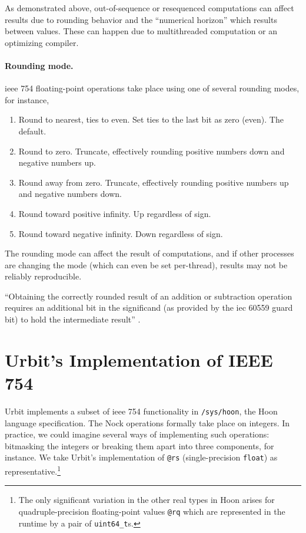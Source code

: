 \documentclass[twoside]{article}
\begin{document}
As demonstrated above, out-of-sequence or resequenced computations can affect results due to rounding behavior and the “numerical horizon” which results between values.  These can happen due to multithreaded computation or an optimizing compiler.

\paragraph{Rounding mode.}

{\sc ieee} 754 floating-point operations take place using one of several rounding modes, for instance,

\begin{enumerate}
  \item  Round to nearest, ties to even.  Set ties to the last bit as zero (even).  The default.
  \item  Round to zero.  Truncate, effectively rounding positive numbers down and negative numbers up.
  \item  Round away from zero.  Truncate, effectively rounding positive numbers up and negative numbers down.
  \item  Round toward positive infinity.  Up regardless of sign.
  \item  Round toward negative infinity.  Down regardless of sign.
\end{enumerate}

\noindent
The rounding mode can affect the result of computations, and if other processes are changing the mode (which can even be set per-thread), results may not be reliably reproducible.

“Obtaining the correctly rounded result of an addition or subtraction operation requires an additional bit in the significand (as provided by the {\sc iec} 60559 guard bit) to hold the intermediate result” \citetext{\citet{Jones2008}, p.~65}.


\section[Urbit's Implementation of \textsc{\textbf{ieee}} 754]{Urbit's Implementation of IEEE 754}

Urbit implements a subset of {\sc ieee} 754 functionality in \lstinline[style=inlinecode]{/sys/hoon}, the Hoon language specification.  The Nock operations formally take place on integers.  In practice, we could imagine several ways of implementing such operations:  bitmasking the integers or breaking them apart into three components, for instance.  We take Urbit's implementation of \lstinline[style=inlinecode]{@rs} (single-precision \texttt{float}) as representative.\footnote{The only significant variation in the other real types in Hoon arises for quadruple-precision floating-point values \lstinline[style=inlinecode]{@rq} which are represented in the runtime by a pair of \texttt{uint64\_t}s.}
\end{document}
